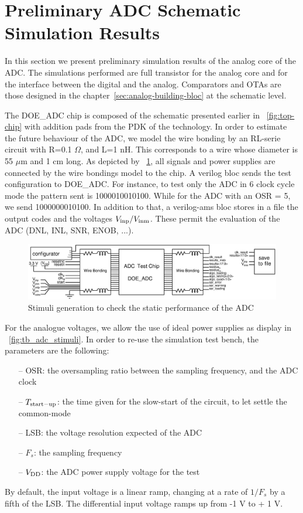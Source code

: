 \clearpage
\section{Preliminary ADC Schematic Simulation Results}
In this section we present preliminary simulation results of the analog core of the ADC\@. The simulations performed are full transistor for the analog core and for the interface between the digital and the analog. Comparators and OTAs are those designed in the chapter~\ref{sec:analog-building-bloc} at the schematic level.

The DOE\_ADC chip is composed of the schematic presented earlier in \figurename~\ref{fig:top-chip} with addition pads from the PDK of the technology. In order to estimate the future behaviour of the ADC, we model the wire bonding by an RL-serie circuit with R=0.1 $\Omega$, and L=1 nH. This corresponds to a wire whose diameter is 55 $\mu$m and 1 cm long.
As depicted by \figurename~\ref{fig:tb_adc-top}, all signals and power supplies are connected by the wire bondings model to the chip. A verilog bloc sends the test configuration to DOE\_ADC\@. For instance, to test only the ADC in 6 clock cycle mode the pattern sent is 1000010010100. While for the ADC with an OSR = 5, we send 1000000010100. In addition to that, a verilog-ams bloc stores in a file the output codes and the voltages $V_{\rm inp}/V_{\rm inm}$. These permit the evaluation of the ADC (DNL, INL, SNR, ENOB, ...).

\begin{figure}[htp]
    \centering
    \includegraphics[width=\textwidth]{Chapter5/Figs/adc_chip/tb_adc_full.ps}
    \caption{Stimuli generation to check the static performance of the ADC}
    \label{fig:tb_adc-top}
\end{figure}

For the analogue voltages, we allow the use of ideal power supplies as display in \figurename~\ref{fig:tb_adc_stimuli}. In order to re-use the simulation test bench, the parameters are the following:
\begin{itemize}
    \item[--] OSR: the oversampling ratio between the sampling frequency, and the ADC clock
    \item[--] $T_{\rm start-up}$: the time given for the slow-start of the circuit, to let settle the common-mode
    \item[--] LSB: the voltage resolution expected of the ADC
    \item[--] $F_s$: the sampling frequency
    \item[--] $V_{\rm DD}$: the ADC power supply voltage for the test
\end{itemize}
By default, the input voltage is a linear ramp, changing at a rate of $1/F_s$ by a fifth of the LSB\@. The differential input voltage ramps up from -1 V to + 1 V.


